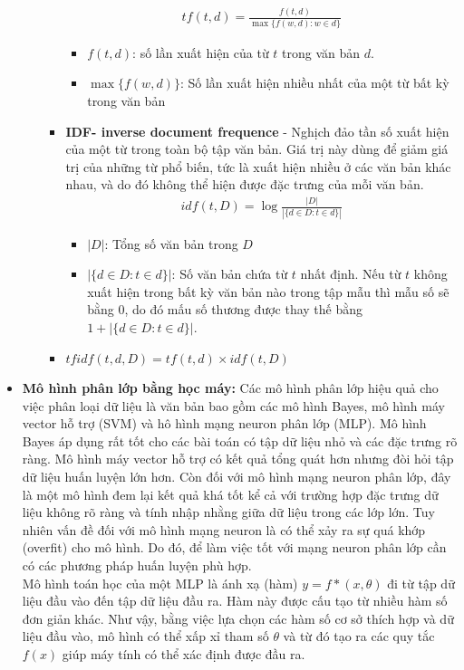 \documentclass[14pt]{extreport}
\begin{document}
\begin{itemize}
\begin{itemize}
\begin{itemize}
            \begin{align*}
                tf(t, d)= \frac{f(t,d)}{\max \{f(w,d):w\in d\}}
            \end{align*}
            \begin{itemize}
                \item \textbf{$f(t,d)$}: số lần xuất hiện của từ $t$ trong văn bản $d$.
                \item \textbf{$\max \{ f(w,d) \}$}: Số lần xuất hiện nhiều nhất của một từ bất kỳ trong văn bản
            \end{itemize}
            \item \textbf{IDF- inverse document frequence} - Nghịch đảo tần số xuất hiện của một từ trong toàn bộ tập văn bản. Giá trị này dùng để giảm giá trị của những từ phổ biến, tức là xuất hiện nhiều ở các văn bản khác nhau, và do đó không thể hiện được đặc trưng của mỗi văn bản.
            \begin{align*}
                idf(t, D)= \log \frac{|D|}{|\{d \in D: t \in d \}|}
            \end{align*}
            \begin{itemize}
                \item $|D|$: Tổng số văn bản trong $D$
                \item $|\{d \in D: t\in d\}|$: Số văn bản chứa từ $t$ nhất định. Nếu từ $t$ không xuất hiện trong bất kỳ văn bản nào trong tập mẫu thì mẫu số sẽ bằng 0, do đó mấu số thương được thay thế bằng $1+|\{d \in D: t\in d\}|$.
            \end{itemize}
            \item $tfidf(t, d, D)= tf (t,d) \times idf(t,D)$
            
        \end{itemize}
    \end{itemize}
    \item \textbf{Mô hình phân lớp bằng học máy:} Các mô hình phân lớp hiệu quả cho việc phân loại dữ liệu là văn bản bao gồm các mô hình Bayes, mô hình máy vector hỗ trợ (SVM) và hô hình mạng neuron phân lớp (MLP). Mô hình Bayes áp dụng rất tốt cho các bài toán có tập dữ liệu nhỏ và các đặc trưng rõ ràng. Mô hình máy vector hỗ trợ có kết quả tổng quát hơn nhưng đòi hỏi tập dữ liệu huấn luyện lớn hơn. Còn đối với mô hình mạng neuron phân lớp, đây là một mô hình đem lại kết quả khá tốt kể cả với trường hợp đặc trưng dữ liệu không rõ ràng và tính nhập nhằng giữa dữ liệu trong các lớp lớn. Tuy nhiên vấn đề đối với mô hình mạng neuron là có thể xảy ra sự quá khớp (overfit) cho mô hình. Do đó, để làm việc tốt với mạng neuron phân lớp cần có các phương pháp huấn luyện phù hợp.\\
    Mô hình toán học của một MLP là ánh xạ (hàm) $y = f*(x, \theta)$ đi từ tập dữ liệu đầu vào đến tập dữ liệu đầu ra. Hàm này được cấu tạo từ nhiều hàm số đơn giản khác. Như vậy, bằng việc lựa chọn các hàm số cơ sở thích hợp và dữ liệu đầu vào, mô hình có thể xấp xỉ tham số $\theta$ và từ đó tạo ra các quy tắc $f(x)$ giúp máy tính có thể xác định được đầu ra.
    

\end{itemize}
\end{document}

